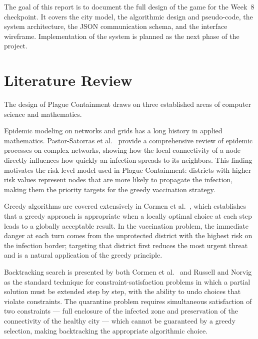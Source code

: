 \documentclass[12pt, a4paper]{article}
\begin{document}
The goal of this report is to document the full design of the game for
the Week~8 checkpoint. It covers the city model, the algorithmic design and
pseudo-code, the system architecture, the JSON communication schema, and the
interface wireframe. Implementation of the system is planned as the next
phase of the project.

\section{Literature Review}

The design of Plague Containment draws on three established areas of
computer science and mathematics.

Epidemic modeling on networks and grids has a long history in applied
mathematics. Pastor-Satorras et al.~\cite{pastor2015epidemic} provide a
comprehensive review of epidemic processes on complex networks, showing how
the local connectivity of a node directly influences how quickly an
infection spreads to its neighbors. This finding motivates the risk-level
model used in Plague Containment: districts with higher risk values represent
nodes that are more likely to propagate the infection, making them the
priority targets for the greedy vaccination strategy.

Greedy algorithms are covered extensively in Cormen et
al.~\cite{cormen2009introduction}, which establishes that a greedy approach
is appropriate when a locally optimal choice at each step leads to a
globally acceptable result. In the vaccination problem, the immediate danger
at each turn comes from the unprotected district with the highest risk on
the infection border; targeting that district first reduces the most urgent
threat and is a natural application of the greedy principle.

Backtracking search is presented by both Cormen et
al.~\cite{cormen2009introduction} and Russell and
Norvig~\cite{russell2020artificial} as the standard technique for
constraint-satisfaction problems in which a partial solution must be
extended step by step, with the ability to undo choices that violate
constraints. The quarantine problem requires simultaneous satisfaction of
two constraints --- full enclosure of the infected zone and preservation of
the connectivity of the healthy city --- which cannot be guaranteed by a
greedy selection, making backtracking the appropriate algorithmic choice.

\end{document}

